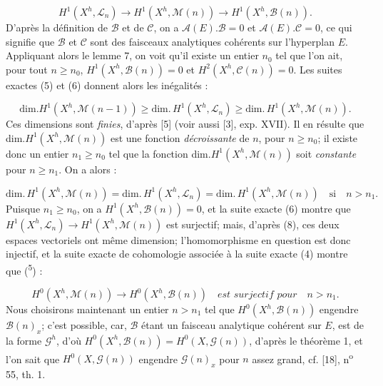 \begin{equation}\tag{6}
H^1(X^h, \mathcal{L}_n) \to H^1(X^h, \mathcal{M}(n)) \to H^1(X^h, \mathcal{B}(n)).
\end{equation}
D'après la définition de $\mathcal{B}$ et de $\mathcal{C}$, on a $\mathcal{A}(E).\mathcal{B} = 0$ et $\mathcal{A}(E).\mathcal{C} = 0$, ce qui signifie que $\mathcal{B}$ et $\mathcal{C}$ sont des faisceaux analytiques cohérents sur l'hyperplan $E$. Appliquant alors le lemme 7, on voit qu'il existe un entier $n_0$ tel que l'on ait, pour tout $n \geqslant n_0$, $H^1(X^h, \mathcal{B}(n)) = 0$ et $H^2(X^h, \mathcal{C}(n)) = 0$. Les suites exactes (5) et (6) donnent alors les inégalités :

\begin{equation}\tag{7}
\mathrm{dim.}H^1(X^h, \mathcal{M}(n-1)) \geqslant \mathrm{dim.}\,H^1(X^h, \mathcal{L}_n) \geqslant \mathrm{dim.}\,H^1(X^h, \mathcal{M}(n)).
\end{equation}
Ces dimensions sont \textit{finies}, d'après [5] (voir aussi [3], exp. XVII). Il en résulte que dim.$H^1(X^h, \mathcal{M}(n))$ est une fonction \textit{décroissante} de $n$, pour $n \geqslant n_0$; il existe donc un entier $n_1 \geqslant n_0$ tel que la fonction dim.$H^1(X^h, \mathcal{M}(n))$ soit \textit{constante} pour $n \geqslant n_1$. On a alors :

\begin{equation}\tag{8}
\mathrm{dim.}\,H^1(X^h, \mathcal{M}(n)) = \mathrm{dim.}\,H^1(X^h, \mathcal{L}_n) = \mathrm{dim.}\,H^1(X^h, \mathcal{M}(n)) \quad \mathrm{si} \quad n > n_1.
\end{equation}
Puisque $n_1 \geqslant n_0$, on a $H^1(X^h, \mathcal{B}(n)) = 0$, et la suite exacte (6) montre que $H^1(X^h, \mathcal{L}_n) \to H^1(X^h, \mathcal{M}(n))$ est surjectif; mais, d'après (8), ces deux espaces vectoriels ont même dimension; l'homomorphisme en question est donc injectif, et la suite exacte de cohomologie associée à la suite exacte (4) montre que (\textsuperscript{5}) :

\begin{equation}\tag{9}
H^0(X^h, \mathcal{M}(n)) \to H^0(X^h, \mathcal{B}(n)) \quad \textit{est surjectif pour} \quad n > n_1.
\end{equation}
Nous choisirons maintenant un entier $n > n_1$ tel que $H^0(X^h, \mathcal{B}(n))$ engendre $\mathcal{B}(n)_x$; c'est possible, car, $\mathcal{B}$ étant un faisceau analytique cohérent sur $E$, est de la forme $\mathcal{G}^h$, d'où $H^0(X^h, \mathcal{B}(n)) = H^0(X, \mathcal{G}(n))$, d'après le théorème 1, et l'on sait que $H^0(X, \mathcal{G}(n))$ engendre $\mathcal{G}(n)_x$ pour $n$ assez grand, cf. [18], n\textsuperscript{o} 55, th. 1.

